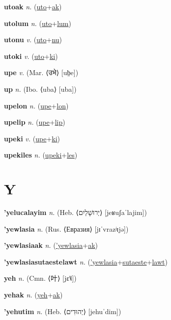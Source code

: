 \textbf{\hypertarget{utoak}{utoak}} \textit{n.} (\hyperlink{uto}{uto}+\allowbreak \hyperlink{ak}{ak})


\textbf{\hypertarget{utolum}{utolum}} \textit{n.} (\hyperlink{uto}{uto}+\allowbreak \hyperlink{lum}{lum})


\textbf{\hypertarget{utonu}{utonu}} \textit{v.} (\hyperlink{uto}{uto}+\allowbreak \hyperlink{nu}{nu})


\textbf{\hypertarget{utoki}{utoki}} \textit{v.} (\hyperlink{uto}{uto}+\allowbreak \hyperlink{ki}{ki})


\textbf{\hypertarget{upe}{upe}} \textit{v.} (Mar. ⟨{\devanagari{}उभे}⟩ [ub̤e])


\textbf{\hypertarget{up}{up}} \textit{n.} (Ibo. ⟨uba⟩ [uba])


\textbf{\hypertarget{upelon}{upelon}} \textit{n.} (\hyperlink{upe}{upe}+\allowbreak \hyperlink{lon}{lon})


\textbf{\hypertarget{upelip}{upelip}} \textit{n.} (\hyperlink{upe}{upe}+\allowbreak \hyperlink{lip}{lip})


\textbf{\hypertarget{upeki}{upeki}} \textit{v.} (\hyperlink{upe}{upe}+\allowbreak \hyperlink{ki}{ki})


\textbf{\hypertarget{upekiles}{upekiles}} \textit{n.} (\hyperlink{upeki}{upeki}+\allowbreak \hyperlink{les}{les})


\section{Y}

\textbf{\hypertarget{'yelucalayim}{'yelucalayim}} \textit{n.} (Heb. ⟨{\hebrew{}יְרוּשָׁלַיִם}⟩ [jeʁuʃaˈlajim])


\textbf{\hypertarget{'yewlasia}{'yewlasia}} \textit{n.} (Rus. ⟨Евразия⟩ [jɪˈvrazʲɪjə])


\textbf{\hypertarget{'yewlasiaak}{'yewlasiaak}} \textit{n.} (\hyperlink{'yewlasia}{'yewlasia}+\allowbreak \hyperlink{ak}{ak})


\textbf{\hypertarget{'yewlasiasutaestelawt}{'yewlasiasutaestelawt}} \textit{n.} (\hyperlink{'yewlasia}{'yewlasia}+\allowbreak \hyperlink{sutaeste}{sutaeste}+\allowbreak \hyperlink{lawt}{lawt})


\textbf{\hypertarget{yeh}{yeh}} \textit{n.} (Cmn. ⟨{\chinese{}叶}⟩ [jɛ˥˩])


\textbf{\hypertarget{yehak}{yehak}} \textit{n.} (\hyperlink{yeh}{yeh}+\allowbreak \hyperlink{ak}{ak})


\textbf{\hypertarget{'yehutim}{'yehutim}} \textit{n.} (Heb. ⟨{\hebrew{}יְהוּדִים}⟩ [jehuˈdim])


